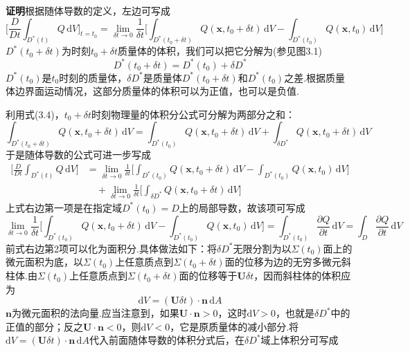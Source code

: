 \noindent\textbf{证明}\quad 根据随体导数的定义，左边可写成
\[
\bigg[\frac{D}{Dt}\int_{D^{*}(t)}Q\,\mathrm{d}V\bigg]_{t=t_0}=\lim_{\delta t\to 0}\frac{1}{\delta t}\bigg[\int_{D^{*}(t_0+\delta t)}Q(\boldsymbol{x},t_0+\delta t)\,\mathrm{d}V-\int_{D^{*}(t_0)}Q(\boldsymbol{x},t_0)\,\mathrm{d}V\bigg]
\]
$D^{*}(t_0+\delta t)$为时刻$t_0+\delta t$质量体的体积，我们可以把它分解为(参见图3.1)
\begin{equation*}
D^{*}(t_0+\delta t)=D^{*}(t_0)+\delta D^{*}
\tag{3.4}
\end{equation*}
$D^{*}(t_0)$是$t_0$时刻的质量体，$\delta D^{*}$是质量体$D^{*}(t_0+\delta t)$和$D^{*}(t_0)$之差.根据质量体边界面运动情况，这部分质量体的体积可以为正值，也可以是负值.

利用式(3.4)，$t_0+\delta t$时刻物理量的体积分公式可分解为两部分之和：
\[
\int_{D^{*}(t_0+\delta t)}Q(\boldsymbol{x},t_0+\delta t)\,\mathrm{d}V=\int_{D^{*}(t_0)}Q(\boldsymbol{x},t_0+\delta t)\,\mathrm{d}V+\int_{\delta D^{*}}Q(\boldsymbol{x},t_0+\delta t)\,\mathrm{d}V
\]
于是随体导数的公式可进一步写成
\begin{align*}
\bigg[\frac{D}{Dt}\int_{D^{*}(t)}Q\,\mathrm{d}V\bigg]&=\lim_{\delta t\to 0}\frac{1}{\delta t}\bigg[\int_{D^{*}(t_0)}Q(\boldsymbol{x},t_0+\delta t)\,\mathrm{d}V-\int_{D^{*}(t_0)}Q(\boldsymbol{x},t_0)\,\mathrm{d}V\bigg]\\
&\quad+\lim_{\delta t\to 0}\frac{1}{\delta t}\bigg[\int_{\delta D^{*}}Q(\boldsymbol{x},t_0+\delta t)\,\mathrm{d}V\bigg]
\end{align*}
上式右边第一项是在指定域$D^{*}(t_0)=D$上的局部导数，故该项可写成
\[
\lim_{\delta t\to 0}\frac{1}{\delta t}\bigg[\int_{D^{*}(t_0)}Q(\boldsymbol{x},t_0+\delta t)\,\mathrm{d}V-\int_{D^{*}(t_0)}Q(\boldsymbol{x},t_0)\,\mathrm{d}V\bigg]=\int_{D^{*}(t_0)}\frac{\partial Q}{\partial t}\,\mathrm{d}V=\int_D \frac{\partial Q}{\partial t}\,\mathrm{d}V
\]
前式右边第2项可以化为面积分.具体做法如下：将$\delta D^{*}$无限分割为以$\Sigma(t_0)$面上的微元面积为底，以$\Sigma(t_0)$上任意质点到$\Sigma(t_0+\delta t)$面的位移为边的无穷多微元斜柱体.由$\Sigma(t_0)$上任意质点到$\Sigma(t_0+\delta t)$面的位移等于$\boldsymbol{U}\delta t$，因而斜柱体的体积应为
\[
\mathrm{d}V=(\boldsymbol{U}\delta t)\cdot\boldsymbol{n}\,\mathrm{d}A
\]
$\boldsymbol{n}$为微元面积的法向量.应当注意到，如果$\boldsymbol{U}\cdot\boldsymbol{n}>0$，这时$\mathrm{d}V>0$，也就是$\delta D^{*}$中的正值的部分；反之$\boldsymbol{U}\cdot\boldsymbol{n}<0$，则$\mathrm{d}V<0$，它是原质量体的减小部分.将$\mathrm{d}V=(\boldsymbol{U}\delta t)\cdot\boldsymbol{n}\,\mathrm{d}A$代入前面随体导数的体积分式后，在$\delta D^{*}$域上体积分可写成
